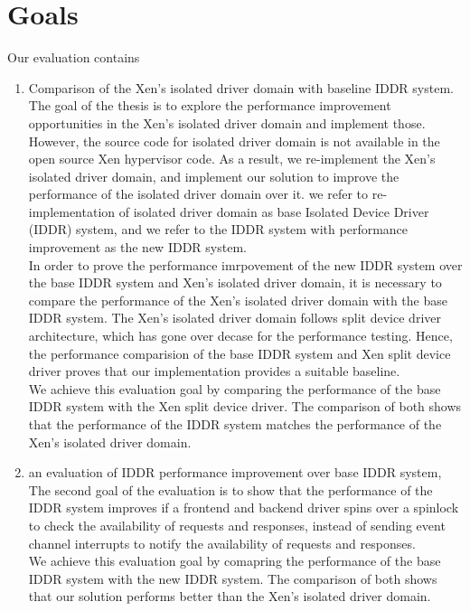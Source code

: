 \section{Goals}
\label{sec:goals}
Our evaluation contains 
\begin{enumerate}
\item Comparison of the Xen's isolated driver domain with baseline IDDR system.
\\[3mm]
The goal of the thesis is to explore the performance improvement opportunities in the Xen's isolated driver domain and implement those. However, the source code for isolated driver domain is not available in the open source Xen hypervisor code. As a result, we re-implement the Xen's isolated driver domain, and implement our solution to improve the performance of the isolated driver domain over it. we refer to re-implementation of isolated driver domain as base Isolated Device Driver (IDDR) system, and we refer to the IDDR system with performance improvement as the new IDDR system.
\\[3mm]
In order to prove the performance imrpovement of the new IDDR system over the base IDDR system and Xen's isolated driver domain, it is necessary to compare the performance of the Xen's isolated driver domain with the base IDDR system. The Xen's isolated driver domain follows split device driver architecture, which has gone over decase for the performance testing. Hence, the performance comparision of the base IDDR system and Xen split device driver proves that our implementation provides a suitable baseline.
\\[3mm]
We achieve this evaluation goal by comparing the performance of the base IDDR system with the Xen split device driver. The comparison of both shows that the performance of the IDDR system matches the performance of the Xen's isolated driver domain. 

\item an evaluation of IDDR performance improvement over base IDDR system,
\\[3mm] 
The second goal of the evaluation is to show that the performance of the IDDR system improves if a frontend and backend driver spins over a spinlock to check the availability of requests and responses, instead of sending event channel interrupts to notify the availability of requests and responses. 
\\[3mm]
We achieve this evaluation goal by comapring the performance of the base IDDR system with the new IDDR system. The comparison of both shows that our solution performs better than the Xen's isolated driver domain.
\end{enumerate}

